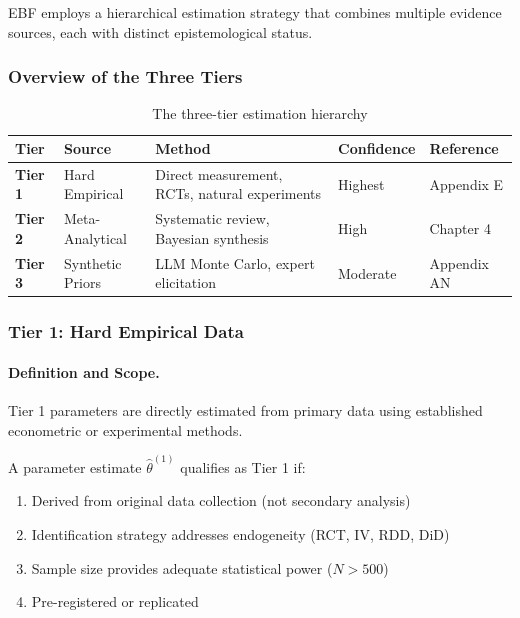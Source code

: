 EBF employs a hierarchical estimation strategy that combines multiple 
evidence sources, each with distinct epistemological status.

\subsubsection{Overview of the Three Tiers}

\begin{table}[h]
\centering
\small
\begin{tabular}{p{1.5cm}p{3cm}p{3.5cm}p{2cm}p{2cm}}
\toprule
\textbf{Tier} & \textbf{Source} & \textbf{Method} & \textbf{Confidence} & \textbf{Reference} \\
\midrule
\textbf{Tier 1} & Hard Empirical & Direct measurement, RCTs, natural experiments & Highest & Appendix E \\
\textbf{Tier 2} & Meta-Analytical & Systematic review, Bayesian synthesis & High & Chapter 4 \\
\textbf{Tier 3} & Synthetic Priors & LLM Monte Carlo, expert elicitation & Moderate & Appendix AN \\
\bottomrule
\end{tabular}
\caption{The three-tier estimation hierarchy}
\label{tab:three-tiers}
\end{table}

\subsubsection{Tier 1: Hard Empirical Data}

\paragraph{Definition and Scope.}

Tier 1 parameters are directly estimated from primary data using established 
econometric or experimental methods.

\begin{definition}
A parameter estimate $\hat{\theta}^{(1)}$ qualifies as Tier 1 if:
\begin{enumerate}
    \item Derived from original data collection (not secondary analysis)
    \item Identification strategy addresses endogeneity (RCT, IV, RDD, DiD)
    \item Sample size provides adequate statistical power ($N > 500$)
    \item Pre-registered or replicated
\end{enumerate}
\end{definition}

